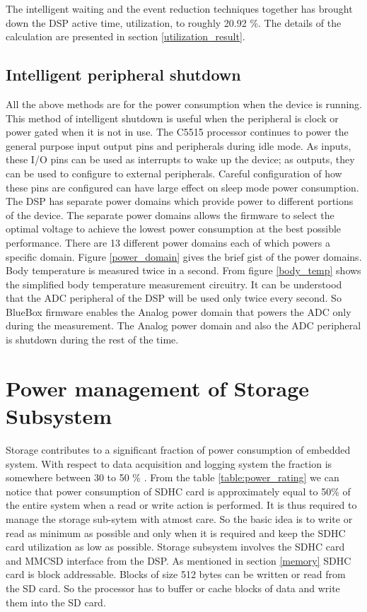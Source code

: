  The intelligent waiting and the event reduction techniques together has brought down the DSP active time, utilization, to roughly 20.92 \%. The details of the calculation are presented in section \ref{utilization_result}.

\subsection{Intelligent peripheral shutdown}
All the above methods are for the power consumption when the device is running. This method of intelligent shutdown is useful when the peripheral is clock or power gated when it is not in use. The C5515 processor continues to power the general purpose input output pins and peripherals during idle mode. As inputs, these I/O pins can be used as interrupts to wake up the device; as outputs, they can be used to configure to external peripherals. Careful configuration of how these pins are configured can have large effect on sleep mode power consumption. The DSP has separate power domains which provide power to different portions of the device. The separate power domains allows the firmware to select the optimal voltage to achieve the lowest power consumption at the best possible performance. There are 13 different power domains each of which powers a specific domain. Figure \ref{power_domain} gives the brief gist of the power domains. Body temperature is measured twice in a second. From figure \ref{body_temp} shows the simplified body temperature measurement circuitry. It can be understood that the ADC peripheral of the DSP will be used only twice every second. So BlueBox firmware enables the Analog power domain that powers the ADC only during the measurement. The Analog power domain and also the ADC peripheral is shutdown during the rest of the time. 

\section{Power management of Storage Subsystem}
Storage contributes to a significant fraction of power consumption of embedded system. With respect to data acquisition and logging system the fraction is somewhere between 30 to 50 \% . From the table \ref{table:power_rating} we can notice that power consumption of SDHC card is approximately equal to 50\% of the entire system when a read or write action is performed. It is thus required to manage the storage sub-sytem with atmost care. So the basic idea is to write or read as minimum as possible and only when it is required and keep the SDHC card utilization as low as possible.
Storage subsystem involves the SDHC card and MMCSD interface from the DSP. As mentioned in section \ref{memory} SDHC card is block addressable. Blocks of size 512 bytes can be written or read from the SD card. So the processor has to buffer or cache blocks of data and write them into the SD card.  


